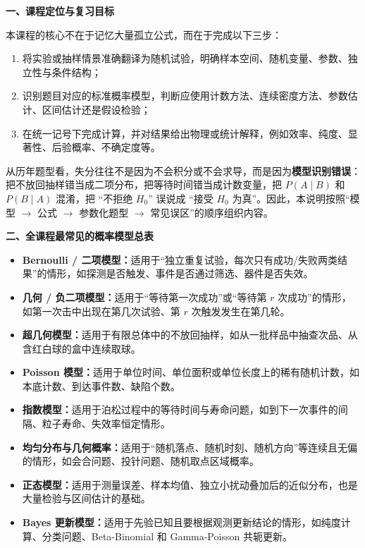 ﻿

\textbf{一、课程定位与复习目标}

本课程的核心不在于记忆大量孤立公式，而在于完成以下三步：
\begin{enumerate}
  \item 将实验或抽样情景准确翻译为随机试验，明确样本空间、随机变量、参数、独立性与条件结构；
  \item 识别题目对应的标准概率模型，判断应使用计数方法、连续密度方法、参数估计、区间估计还是假设检验；
  \item 在统一记号下完成计算，并对结果给出物理或统计解释，例如效率、纯度、显著性、后验概率、不确定度等。
\end{enumerate}

从历年题型看，失分往往不是因为不会积分或不会求导，而是因为\textbf{模型识别错误}：把不放回抽样错当成二项分布，把等待时间错当成计数变量，把 $P(A\mid B)$ 和 $P(B\mid A)$ 混淆，把 ``不拒绝 $H_0$'' 误说成 ``接受 $H_0$ 为真''。因此，本说明按照“模型 $\to$ 公式 $\to$ 参数化题型 $\to$ 常见误区”的顺序组织内容。

\textbf{二、全课程最常见的概率模型总表}

\begin{itemize}[leftmargin=2em,itemsep=0.18em,topsep=0.18em]
  \item \textbf{Bernoulli / 二项模型：}适用于“独立重复试验，每次只有成功/失败两类结果”的情形，如探测是否触发、事件是否通过筛选、器件是否失效。
  \item \textbf{几何 / 负二项模型：}适用于“等待第一次成功”或“等待第 $r$ 次成功”的情形，如第一次击中出现在第几次试验、第 $r$ 次触发发生在第几轮。
  \item \textbf{超几何模型：}适用于有限总体中的不放回抽样，如从一批样品中抽查次品、从含红白球的盒中连续取球。
  \item \textbf{Poisson 模型：}适用于单位时间、单位面积或单位长度上的稀有随机计数，如本底计数、到达事件数、缺陷个数。
  \item \textbf{指数模型：}适用于泊松过程中的等待时间与寿命问题，如到下一次事件的间隔、粒子寿命、失效率恒定情形。
  \item \textbf{均匀分布与几何概率：}适用于“随机落点、随机时刻、随机方向”等连续且无偏的情形，如会合问题、投针问题、随机取点区域概率。
  \item \textbf{正态模型：}适用于测量误差、样本均值、独立小扰动叠加后的近似分布，也是大量检验与区间估计的基础。
  \item \textbf{Bayes 更新模型：}适用于先验已知且要根据观测更新结论的情形，如纯度计算、分类问题、Beta-Binomial 和 Gamma-Poisson 共轭更新。
\end{itemize}

